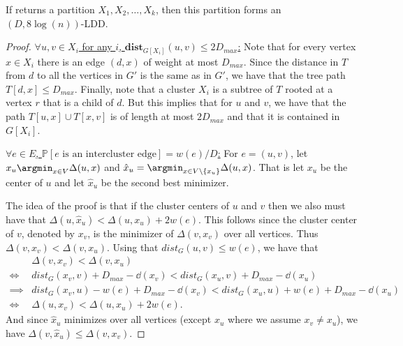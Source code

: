 \begin{lemma}
If  returns a partition $X_1, X_2, \ldots, X_k$, then this partition forms an $(D,  8 \log(n))$-LDD.
\end{lemma}
\begin{proof}
\underline{$\forall u,v \in X_i$ for any $i$, $\mathbf{dist}_{G[X_i]}(u,v) \leq 2 D_{max}$:}
Note that for every vertex $x \in X_i$ there is an edge $(d,x)$ of weight at most $D_{max}$. Since the distance in $T$ from $d$ to all the vertices in $G'$ is the same as in $G'$, we have that the tree path $T[d,x] \leq D_{max}$. Finally, note that a cluster $X_i$ is a subtree of $T$ rooted at a vertex $r$ that is a child of $d$. But this implies that for $u$ and $v$, we have that the path $T[u, x] \cup T[x,v]$ is of length at most $2D_{max}$ and that it is contained in $G[X_i]$. 

\underline{$\forall e \in E$, $\mathbb{P}[e \text{ is an intercluster edge}] = w(e)/ D$:} For $e = (u,v)$, let $x_u \argmin_{x \in V} \Delta(u, x)$ and $\hat{x}_u =  \argmin_{x \in V \setminus \{x_u \}} \Delta(u, x)$. That is let $x_u$ be the center of $u$ and let $\hat{x}_u$ be the second best minimizer. 

The idea of the proof is that if the cluster centers of $u$ and $v$ then we also must have that $\Delta(u, \hat{x}_u) < \Delta(u, x_u) + 2 w(e)$. This follows since the cluster center of $v$, denoted by $x_v$, is the minimizer of $\Delta(v, x_v)$ over all vertices. Thus $\Delta(v, x_v) < \Delta(v, x_u)$. Using that $dist_G(u,v) \leq w(e)$, we have that 
\begin{align*}
& \Delta(v, x_v) < \Delta(v, x_u)\\
\iff &dist_G(x_v , v) + D_{max} - \dd(x_v) < dist_G(x_u , v) + D_{max} - \dd(x_u) \\
\implies &dist_G(x_v , u) - w(e)+ D_{max}  - \dd(x_v) < dist_G(x_u , u) + w(e) + D_{max} - \dd(x_u)\\
\iff & \Delta(u,x_v)  < \Delta(u, x_u) + 2w(e).
\end{align*}
And since $\hat{x}_u$ minimizes over all vertices (except $x_u$ where we assume $x_v \neq x_u$), we have $\Delta(v, \hat{x}_u) \leq \Delta(v, x_v)$. 


\end{proof}
